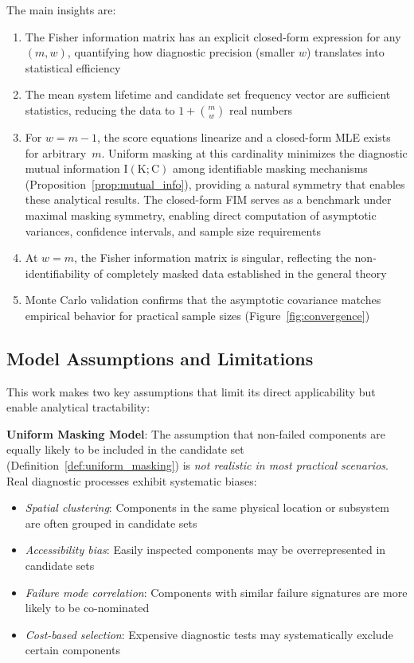 \documentclass[12pt]{article}
\newcommand{\RV}[1]{\mathrm{#1}}
\newcommand{\cand}{\RV{C}}         %
\theoremstyle{definition}
\theoremstyle{remark}
\begin{document}
The main insights are:
\begin{enumerate}
\item The Fisher information matrix has an explicit closed-form expression for any $(m, w)$, quantifying how diagnostic precision (smaller $w$) translates into statistical efficiency
\item The mean system lifetime and candidate set frequency vector are sufficient statistics, reducing the data to $1 + \binom{m}{w}$ real numbers
\item For $w = m-1$, the score equations linearize and a closed-form MLE exists for arbitrary~$m$. Uniform masking at this cardinality minimizes the diagnostic mutual information $\RV{I}(\RV{K}; \cand)$ among identifiable masking mechanisms (Proposition~\ref{prop:mutual_info}), providing a natural symmetry that enables these analytical results. The closed-form FIM serves as a benchmark under maximal masking symmetry, enabling direct computation of asymptotic variances, confidence intervals, and sample size requirements
\item At $w = m$, the Fisher information matrix is singular, reflecting the non-identifiability of completely masked data established in the general theory~\cite{towell2025masked}
\item Monte Carlo validation confirms that the asymptotic covariance matches empirical behavior for practical sample sizes (Figure~\ref{fig:convergence})
\end{enumerate}

\subsection{Model Assumptions and Limitations}
\label{subsec:limitations}

This work makes two key assumptions that limit its direct applicability but enable analytical tractability:

\textbf{Uniform Masking Model}: The assumption that non-failed components are equally likely to be included in the candidate set (Definition~\ref{def:uniform_masking}) is \emph{not realistic in most practical scenarios}. Real diagnostic processes exhibit systematic biases:
\begin{itemize}
\item \emph{Spatial clustering}: Components in the same physical location or subsystem are often grouped in candidate sets
\item \emph{Accessibility bias}: Easily inspected components may be overrepresented in candidate sets
\item \emph{Failure mode correlation}: Components with similar failure signatures are more likely to be co-nominated
\item \emph{Cost-based selection}: Expensive diagnostic tests may systematically exclude certain components
\end{itemize}
\end{document}

